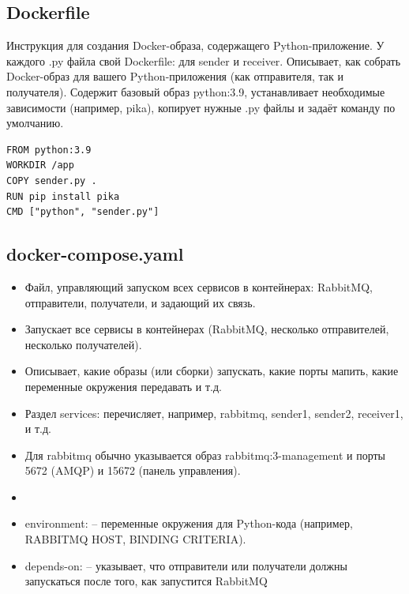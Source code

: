 \documentclass[areasetadvanced]{scrartcl}
\begin{document}
\subsection{Dockerfile}
Инструкция для создания Docker-образа, содержащего Python-приложение. У каждого .py файла свой Dockerfile: для sender и receiver.
Описывает, как собрать Docker-образ для вашего Python-приложения (как отправителя, так и получателя).
Содержит базовый образ python:3.9, устанавливает необходимые зависимости (например, pika), копирует нужные .py файлы и задаёт команду по умолчанию.
\begin{lstlisting}
FROM python:3.9
WORKDIR /app
COPY sender.py .
RUN pip install pika
CMD ["python", "sender.py"]
\end{lstlisting}
\subsection{docker-compose.yaml}
\begin{itemize}
	\item Файл, управляющий запуском всех сервисов в контейнерах: RabbitMQ, отправители, получатели, и задающий их связь.
	\item Запускает все сервисы в контейнерах (RabbitMQ, несколько отправителей, несколько получателей).
	\item Описывает, какие образы (или сборки) запускать, какие порты мапить, какие переменные окружения передавать и т.д.
	\item Раздел services: перечисляет, например, rabbitmq, sender1, sender2, receiver1, и т.д.
	\item Для rabbitmq обычно указывается образ rabbitmq:3-management и порты 5672 (AMQP) и 15672 (панель управления).
	\item {}
	\item environment: – переменные окружения для Python-кода (например, RABBITMQ HOST, BINDING CRITERIA).
	\item depends-on: – указывает, что отправители или получатели должны запускаться после того, как запустится RabbitMQ 
\end{itemize}
\end{document}
